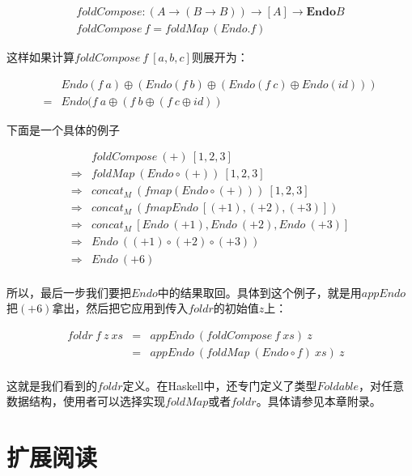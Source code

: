 \documentclass{article}
\begin{document}
\[
\begin{array}{l}
foldCompose : (A \to (B \to B)) \to [A] \to \mathbf{Endo}B \\
foldCompose\ f = foldMap\ (Endo . f)
\end{array}
\]

这样如果计算$foldCompose\ f\ [a, b, c]$则展开为：

\[
\begin{array}{cl}
  & Endo(f\ a) \oplus (Endo(f\ b) \oplus (Endo(f\ c) \oplus Endo(id))) \\
= & Endo(f\ a \oplus (f\ b \oplus (f\ c \oplus id))
\end{array}
\]

下面是一个具体的例子

\[
\begin{array}{cl}
            & foldCompose\ (+)\ [1, 2, 3] \\
\Rightarrow & foldMap\ (Endo \circ (+))\ [1, 2, 3] \\
\Rightarrow & concat_M\ (fmap (Endo \circ (+)))\ [1, 2, 3] \\
\Rightarrow & concat_M\ (fmap Endo\ [(+1), (+2), (+3)]) \\
\Rightarrow & concat_M\ [Endo\ (+1), Endo\ (+2), Endo\ (+3)] \\
\Rightarrow & Endo\ ((+1) \circ (+2) \circ (+3)) \\
\Rightarrow & Endo\ (+6) \\
\end{array}
\]

所以，最后一步我们要把$Endo$中的结果取回。具体到这个例子，就是用$appEndo$把$(+6)$拿出，然后把它应用到传入$foldr$的初始值$z$上：

\[
\begin{array}{rcll}
foldr\ f\ z\ xs
  & = & appEndo\ (foldCompose\ f\ xs)\ z & \\
  & = & appEndo\ (foldMap\ (Endo \circ f)\ xs)\ z \\
\end{array}
\]

这就是我们看到的$foldr$定义。在Haskell中，还专门定义了类型$Foldable$，对任意数据结构，使用者可以选择实现$foldMap$或者$foldr$。具体请参见本章附录。

\section{扩展阅读}
\end{document}
